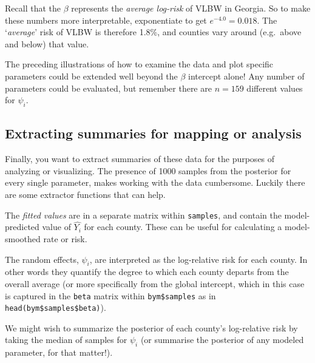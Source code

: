 \documentclass[
]{book}
\newenvironment{Shaded}{\begin{snugshade}}{\end{snugshade}}
\newcommand{\FunctionTok}[1]{\textcolor[rgb]{0.00,0.00,0.00}{#1}}
\newcommand{\NormalTok}[1]{#1}
\newcommand{\OtherTok}[1]{\textcolor[rgb]{0.56,0.35,0.01}{#1}}
\newcommand{\SpecialCharTok}[1]{\textcolor[rgb]{0.00,0.00,0.00}{#1}}
\begin{document}
Recall that the \(\beta\) represents the \emph{average log-risk} of VLBW in Georgia. So to make these numbers more interpretable, exponentiate to get \(e^{-4.0} = 0.018\). The `\emph{average}' risk of VLBW is therefore 1.8\%, and counties vary around (e.g.~above and below) that value.

The preceding illustrations of how to examine the data and plot specific parameters could be extended well beyond the \(\beta\) intercept alone! Any number of parameters could be evaluated, but remember there are \(n=159\) different values for \(\psi_i\).

\hypertarget{extracting-summaries-for-mapping-or-analysis}{%
\subsection{Extracting summaries for mapping or analysis}\label{extracting-summaries-for-mapping-or-analysis}}

Finally, you want to extract summaries of these data for the purposes of analyzing or visualizing. The presence of 1000 samples from the posterior for every single parameter, makes working with the data cumbersome. Luckily there are some extractor functions that can help.

The \emph{fitted values} are in a separate matrix within \texttt{samples}, and contain the model-predicted value of \(\hat{Y_i}\) for each county. These can be useful for calculating a model-smoothed rate or risk.

\begin{Shaded}
\end{Shaded}

The random effects, \(\psi_i\), are interpreted as the log-relative risk for each county. In other words they quantify the degree to which each county departs from the overall average (or more specifically from the global intercept, which in this case is captured in the \texttt{beta} matrix within \texttt{bym\$samples} as in \texttt{head(bym\$samples\$beta)}).

We might wish to summarize the posterior of each county's log-relative risk by taking the median of samples for \(\psi_i\) (or summarise the posterior of any modeled parameter, for that matter!).
\end{document}
